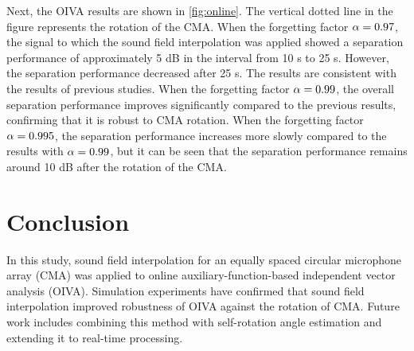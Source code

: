 \documentclass{article}
\begin{document}
Next, the OIVA results are shown in \cref{fig:online}.
The vertical dotted line in the figure represents the rotation of the CMA.
When the forgetting factor $\alpha = 0.97$, the signal to which the sound field interpolation was applied showed a separation performance of approximately 5 dB in the interval from 10 s to 25 s.
However, the separation performance decreased after 25 s. The results are consistent with the results of previous studies.
When the forgetting factor $\alpha = 0.99 $, the overall separation performance improves significantly compared to the previous results, confirming that it is robust to CMA rotation.
When the forgetting factor $\alpha = 0.995$, the separation performance increases more slowly compared to the results with $\alpha = 0.99$, but it can be seen that the separation performance remains around 10 dB after the rotation of the CMA.

\section{Conclusion}
In this study, sound field interpolation for an equally spaced circular microphone array (CMA) was applied to online auxiliary-function-based independent vector analysis (OIVA).
Simulation experiments have confirmed that sound field interpolation improved robustness of OIVA against the rotation of CMA.
Future work includes combining this method with self-rotation angle estimation \cite{Lian:2021:APSIPA} and extending it to real-time processing.

\clearpage\newpage



\clearpage\newpage
\onecolumn
\end{document}
